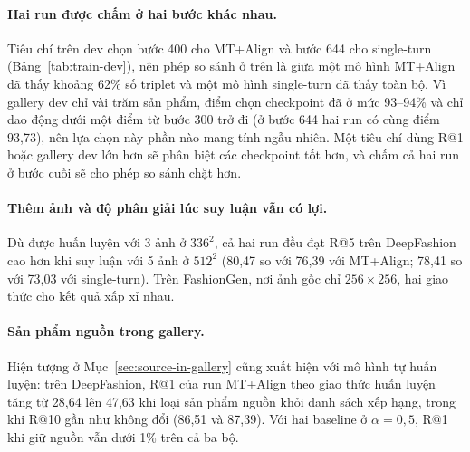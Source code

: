 \paragraph{Hai run được chấm ở hai bước khác nhau.} Tiêu chí trên dev chọn bước 400 cho MT+Align và bước 644 cho single-turn (Bảng~\ref{tab:train-dev}), nên phép so sánh ở trên là giữa một mô hình MT+Align đã thấy khoảng 62\% số triplet và một mô hình single-turn đã thấy toàn bộ. Vì gallery dev chỉ vài trăm sản phẩm, điểm chọn checkpoint đã ở mức 93--94\% và chỉ dao động dưới một điểm từ bước 300 trở đi (ở bước 644 hai run có cùng điểm 93,73), nên lựa chọn này phần nào mang tính ngẫu nhiên. Một tiêu chí dùng R@1 hoặc gallery dev lớn hơn sẽ phân biệt các checkpoint tốt hơn, và chấm cả hai run ở bước cuối sẽ cho phép so sánh chặt hơn.

\paragraph{Thêm ảnh và độ phân giải lúc suy luận vẫn có lợi.} Dù được huấn luyện với 3 ảnh ở $336^2$, cả hai run đều đạt R@5 trên DeepFashion cao hơn khi suy luận với 5 ảnh ở $512^2$ (80,47 so với 76,39 với MT+Align; 78,41 so với 73,03 với single-turn). Trên FashionGen, nơi ảnh gốc chỉ $256 \times 256$, hai giao thức cho kết quả xấp xỉ nhau.

\paragraph{Sản phẩm nguồn trong gallery.} Hiện tượng ở Mục~\ref{sec:source-in-gallery} cũng xuất hiện với mô hình tự huấn luyện: trên DeepFashion, R@1 của run MT+Align theo giao thức huấn luyện tăng từ 28,64 lên 47,63 khi loại sản phẩm nguồn khỏi danh sách xếp hạng, trong khi R@10 gần như không đổi (86,51 và 87,39). Với hai baseline ở $\alpha = 0{,}5$, R@1 khi giữ nguồn vẫn dưới 1\% trên cả ba bộ.

